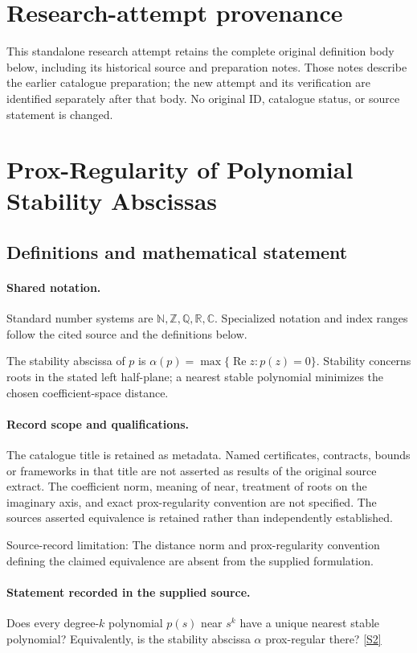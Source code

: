 \documentclass[11pt]{article}
\begin{document}
\section*{Research-attempt provenance}
This standalone research attempt retains the complete original definition body below,
including its historical source and preparation notes. Those notes describe the
earlier catalogue preparation; the new attempt and its verification are identified
separately after that body. No original ID, catalogue status, or source statement is changed.

\section{Prox-Regularity of Polynomial Stability Abscissas}\label{statement}

\subsection{Definitions and mathematical statement}

\paragraph{Shared notation.}Standard number systems are $\mathbb N,\mathbb Z,\mathbb Q,\mathbb R,\mathbb C$. Specialized notation and index ranges follow the cited source and the definitions below.


The stability abscissa of $p$ is $\alpha(p)=\max\{\operatorname{Re}z:p(z)=0\}$. Stability concerns roots in the stated left half-plane; a nearest stable polynomial minimizes the chosen coefficient-space distance.
\paragraph{Record scope and qualifications.}
The catalogue title is retained as metadata. Named certificates, contracts, bounds or frameworks in that title are not asserted as results of the original source extract.
The coefficient norm, meaning of near, treatment of roots on the imaginary axis, and exact prox-regularity convention are not specified. The source\textquotesingle s asserted equivalence is retained rather than independently established.

Source-record limitation: The distance norm and prox-regularity convention defining the claimed equivalence are absent from the supplied formulation.
\paragraph{Statement recorded in the supplied source.}
Does every degree-$k$ polynomial $p(s)$ near $s^k$ have a unique nearest stable polynomial? Equivalently, is the stability abscissa $\alpha$ prox-regular there? \href{https://doi.org/10.4171/owr/2005/02}{[S2]}
\end{document}
